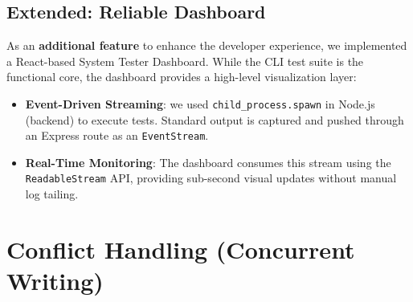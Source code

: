 \documentclass[sigconf]{acmart}
\begin{document}
    

\subsection{Extended: Reliable Dashboard}
As an \textbf{additional feature} to enhance the developer experience, we implemented a React-based System Tester Dashboard. While the CLI test suite is the functional core, the dashboard provides a high-level visualization layer:
\begin{itemize}[leftmargin=*]
    \item \textbf{Event-Driven Streaming}: we used \texttt{child\_process.spawn} in Node.js (backend) to execute tests. Standard output is captured and pushed through an Express route as an \texttt{EventStream}.
    \item \textbf{Real-Time Monitoring}: The dashboard consumes this stream using the \texttt{ReadableStream} API, providing sub-second visual updates without manual log tailing.
\end{itemize}

\section{Conflict Handling (Concurrent Writing)}
\end{document}
